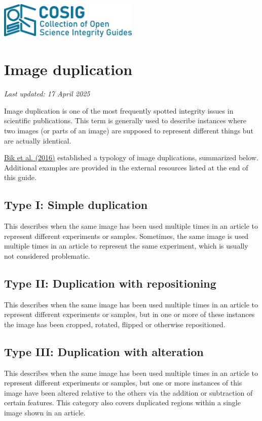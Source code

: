\documentclass[letterpaper, 12pt]{article}
\begin{document}
\flushleft
\includegraphics[width=0.5\textwidth]{img/home/241017_final_logo_mockup.png}

\section*{Image duplication}
\textit{Last updated: 17 April 2025}

Image duplication is one of the most frequently spotted integrity issues in scientific publications. This term is generally used to describe instances where two images (or parts of an image) are supposed to represent different things but are actually identical.

\href{https://doi.org/10.1128/mbio.00809-16}{Bik et al. (2016)} established a typology of image duplications, summarized below. Additional examples are provided in the external resources listed at the end of this guide.

\subsection*{Type I: Simple duplication}

This describes when the same image has been used multiple times in an article to represent different experiments or samples. Sometimes, the same image is used multiple times in an article to represent the same experiment, which is usually not considered problematic.

\subsection*{Type II: Duplication with repositioning}

This describes when the same image has been used multiple times in an article to represent different experiments or samples, but in one or more of these instances the image has been cropped, rotated, flipped or otherwise repositioned.

\subsection*{Type III: Duplication with alteration} 

This describes when the same image has been used multiple times in an article to represent different experiments or samples, but one or more instances of this image have been altered relative to the others via the addition or subtraction of certain features. This category also covers duplicated regions within a single image shown in 
an article.
\end{document}
